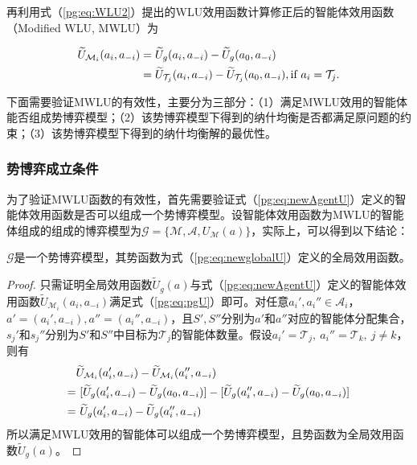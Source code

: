 再利用式（\ref{pg:eq:WLU2}）提出的WLU效用函数计算修正后的智能体效用函数（Modified WLU, MWLU）为

\begin{align}
\label{pg:eq:newAgentU}
	\widetilde U_{\mathcal{M}_i}(a_i,a_{-i}) &= \widetilde U_g(a_i,a_{-i}) - \widetilde U_g(a_0,a_{-i})\notag\\
	&= \widetilde U_{\mathcal{T}_j}(a_i,a_{-i}) - \widetilde U_{\mathcal{T}_j}(a_0,a_{-i}),\quad \text{if}\ a_i=\mathcal{T}_j.
\end{align}

下面需要验证MWLU的有效性，主要分为三部分：（1）满足MWLU效用的智能体能否组成势博弈模型；（2）该势博弈模型下得到的纳什均衡是否都满足原问题的约束；（3）该势博弈模型下得到的纳什均衡解的最优性。

\subsubsection{势博弈成立条件}
\label{pg:mwlu:pgcondition}
为了验证MWLU函数的有效性，首先需要验证式（\ref{pg:eq:newAgentU}）定义的智能体效用函数是否可以组成一个势博弈模型。设智能体效用函数为MWLU的智能体组成的组成的博弈模型为$\mathcal{G}=\{\mathcal{M},\mathcal{A},U_{\mathcal{M}}(a)\}$，实际上，可以得到以下结论：

\begin{proposition}[势博弈成立条件]
	$\mathcal{G}$是一个势博弈模型，其势函数为式（\ref{pg:eq:newglobalU}）定义的全局效用函数。
	
	\begin{proof}
		只需证明全局效用函数$\widetilde U_g(a)$与式（\ref{pg:eq:newAgentU}）定义的智能体效用函数$\widetilde U_{\mathcal{M}_i}(a_i,a_{-i})$满足式（\ref{pg:eq:pgU}）即可。对任意$a_i',a_i'' \in \mathcal{A}_i$，$a'=(a_i',a_{-i}),a''=(a_i'',a_{-i})$，且$S',S''$分别为$a'$和$a''$对应的智能体分配集合，$s_j'$和$s_j''$分别为$S'$和$S''$中目标为$\mathcal{T}_j$的智能体数量。假设$a_i'=\mathcal{T}_j,\ a_i''=\mathcal{T}_k,\ j\neq k$，则有
		\begin{align}
			&\widetilde U_{\mathcal{M}_i}(a_i',a_{-i}) - \widetilde U_{\mathcal{M}_i}(a_i'',a_{-i})\notag\\
			= &\ [\widetilde U_g(a_i',a_{-i}) - \widetilde U_g(a_0,a_{-i})] - [\widetilde U_g(a_i'',a_{-i}) - \widetilde U_g(a_0,a_{-i})]\notag\\
			\label{pg:pf:eq:pg} = &\ \widetilde U_g(a_i',a_{-i}) - \widetilde U_g(a_i'',a_{-i})
		\end{align}
		所以满足MWLU效用的智能体可以组成一个势博弈模型，且势函数为全局效用函数$\widetilde U_g(a)$。
	\end{proof}
\end{proposition}

